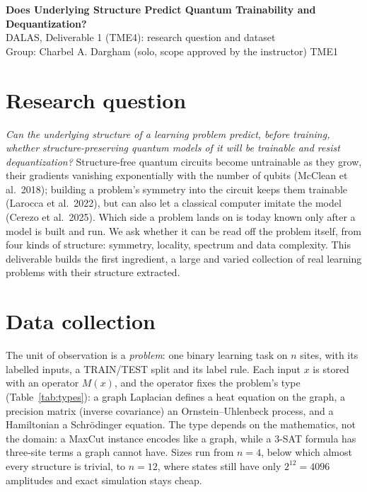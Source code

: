 \documentclass[10pt,a4paper]{article}
\begin{document}
\begin{center}
{\large\bfseries Does Underlying Structure Predict Quantum Trainability and Dequantization?}\\[0.3ex]
{\small DALAS, Deliverable 1 (TME4): research question and dataset}\\[0.2ex]
{\small Group: Charbel A. Dargham (solo, scope approved by the instructor) \quad\textperiodcentered\quad TME1}
\end{center}

\section{Research question}

\emph{Can the underlying structure of a learning problem predict, before training, whether structure-preserving
quantum models of it will be trainable and resist dequantization?} Structure-free quantum circuits become
untrainable as they grow, their gradients vanishing exponentially with the number of qubits (McClean et al.\
2018); building a problem's symmetry into the circuit keeps them trainable (Larocca et al.\ 2022), but can
also let a classical computer imitate the model (Cerezo et al.\ 2025). Which side a problem lands on is today
known only after a model is built and run. We ask whether it can be read off the problem itself, from four
kinds of structure: symmetry, locality, spectrum and data complexity. This deliverable builds the first
ingredient, a large and varied collection of real learning problems with their structure extracted.

\section{Data collection}

The unit of observation is a \emph{problem}: one binary learning task on $n$ sites, with its labelled inputs,
a TRAIN/TEST split and its label rule. Each input $x$ is stored with an operator $M(x)$, and the operator fixes
the problem's type (Table~\ref{tab:types}): a graph Laplacian defines a heat equation on the graph, a precision
matrix (inverse covariance) an Ornstein--Uhlenbeck process, and a Hamiltonian a Schr\"odinger equation. The type
depends on the mathematics, not the domain: a MaxCut instance encodes like a graph, while a 3-SAT formula has
three-site terms a graph cannot have. Sizes run from $n = 4$, below which almost every structure is trivial, to
$n = 12$, where states still have only $2^{12} = 4096$ amplitudes and exact simulation stays cheap.
\end{document}
